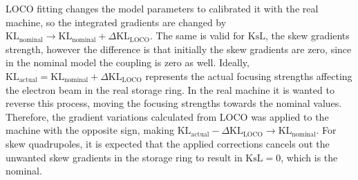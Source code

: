 LOCO fitting changes the model parameters to calibrated it with the real machine, so the integrated gradients are changed by $\mathrm{KL}_{\mathrm{nominal}} \rightarrow \mathrm{KL}_{\mathrm{nominal}} + \Delta\mathrm{KL}_{\mathrm{LOCO}}$. The same is valid for $\mathrm{KsL}$, the skew gradients strength, however the difference is that initially the skew gradients are zero, since in the nominal model the coupling is zero as well. Ideally, $\mathrm{KL}_{\mathrm{actual}} = \mathrm{KL}_{\mathrm{nominal}} + \Delta\mathrm{KL}_{\mathrm{LOCO}}$ represents the actual focusing strengths affecting the electron beam in the real storage ring. In the real machine it is wanted to reverse this process, moving the focusing strengths towards the nominal values. Therefore, the gradient variations calculated from LOCO was applied to the machine with the opposite sign, making $\mathrm{KL}_{\mathrm{actual}} - \Delta\mathrm{KL}_{\mathrm{LOCO}} \rightarrow \mathrm{KL}_{\mathrm{nominal}}$. For skew quadrupoles, it is expected that the applied corrections cancels out the unwanted skew gradients in the storage ring to result in $\mathrm{KsL} = 0$, which is the nominal.

